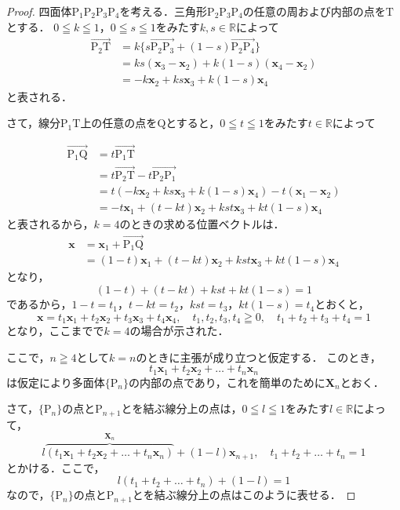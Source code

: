 \documentclass[uplatex,dvipdfmx,a4paper,10pt,fleqn]{jsarticle}
\begin{document}
\begin{leftbar}
    \begin{proof}
    四面体$\mathrm{P_1 P_2 P_3 P_4}$を考える．三角形$\mathrm{P_2 P_3 P_4}$の任意の周および内部の点を$\mathrm{T}$とする．
    $0 \leqq k \leqq 1$，$0 \leqq s \leqq 1$をみたす$k,s \in \mathbb{R}$によって
    \begin{align*}
        \overrightarrow{\mathrm{P_2 T}} & = k \{ s \overrightarrow{\mathrm{P_2 P_3}} + (1-s) \overrightarrow{\mathrm{P_2 P_4}} \} \\
        & = ks(\bm{x}_3 -\bm{x}_2) + k(1-s) (\bm{x}_4-\bm{x}_2) \\
        & = -k\bm{x}_2 + ks \bm{x}_3 + k(1-s) \bm{x}_4
    \end{align*}
    と表される．

    さて，線分$\mathrm{P_1 T}$上の任意の点を$\mathrm{Q}$とすると，$0 \leqq t \leqq 1$をみたす$t \in \mathbb{R}$によって

    \begin{align*} 
        \overrightarrow{\mathrm{P_1 Q}} & =t \overrightarrow{\mathrm{P_1 T}}\\
        & = t\overrightarrow{\mathrm{P_2 T}} - t\overrightarrow{\mathrm{P_2 P_1}}　\\
        & = t (-k\bm{x}_2 + ks \bm{x}_3 + k(1-s) \bm{x}_4)-t(\bm{x}_1 -\bm{x}_2) \\
        & = -t\bm{x}_1 +(t-kt) \bm{x}_2 + kst \bm{x}_3 +kt(1-s) \bm{x}_4 
    \end{align*} 
    と表されるから，$k=4$のときの求める位置ベクトルは．
    \begin{align*}
        \bm{x} & = \bm{x}_1 + \overrightarrow{\mathrm{P_1 Q}} \\
        & = (1-t) \bm{x}_1 +(t-kt)\bm{x}_2 +kst \bm{x}_3 +kt(1-s) \bm{x}_4 
    \end{align*} 
    となり，
    \[
        (1-t)+ (t-kt)+kst + kt(1-s)=1
    \]
    であるから，$1-t = t_1$，$t-kt =t_2$，$kst = t_3$，$kt(1-s)=t_4$とおくと，
    \[
        \bm{x}= t_1 \bm{x}_1 + t_2 \bm{x}_2 + t_3 \bm{x}_3 + t_4 \bm{x}_4 , \quad t_1, t_2 ,t_3 , t_4 \geqq 0 ,\quad  t_1 +t_2 + t_3 + t_4 =1
    \]
    となり，ここまでで$k=4$の場合が示された．

    ここで，$n \geqq 4$として$k=n$のときに主張が成り立つと仮定する．
    このとき，
    \[
        t_1 \bm{x}_1 + t_2 \bm{x}_2+\dots+ t_n \bm{x}_n
    \]
    は仮定により多面体$\{ \mathrm{P}_n \}$の内部の点であり，これを簡単のために$\bm{X}_n$とおく．

    さて，$\{ \mathrm{P}_n \}$の点と$\mathrm{P}_{n+1}$とを結ぶ線分上の点は，$ 0 \leqq l \leqq 1$をみたす$l \in \mathbb{R}$によって，
    \[
        l \overbrace{(  t_1 \bm{x}_1 + t_2 \bm{x}_2+\dots+ t_n \bm{x}_n)}^{\bm{X}_n}+(1-l) \bm{x}_{n+1} , \quad t_1+t_2+\dots + t_n =1 
    \]
    とかける．ここで，
    \[
        l(t_1+t_2+\dots+t_n)+(1-l)=1
    \]
    なので，$\{ \mathrm{P}_n \}$の点と$\mathrm{P}_{n+1}$とを結ぶ線分上の点はこのように表せる．


\end{proof}
\end{leftbar}
\end{document}
